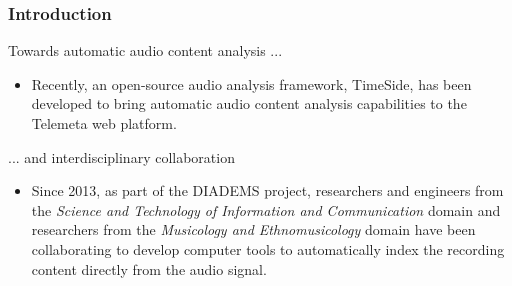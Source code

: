 \documentclass[final, hyperref, table]{beamer}
\begin{document}
\begin{frame}\frametitle{Introduction}
  

\begin{block}{Towards automatic audio content analysis ...}
  \begin{itemize}
  \item Recently, an open-source \alert{audio analysis framework},
    TimeSide, has been developed to bring automatic audio content
    analysis capabilities to the Telemeta web platform.
  \end{itemize}

\end{block}
\begin{block}{... and interdisciplinary collaboration}
  \begin{itemize}
  \item Since 2013, as part of the DIADEMS project, researchers and engineers from the \emph{Science and Technology of Information and Communication} domain and researchers from the \emph{Musicology and Ethnomusicology} domain have been collaborating to develop computer tools to automatically index the recording content directly from the audio signal.%
  \end{itemize}
  
\end{block}

\end{frame}
\end{document}
